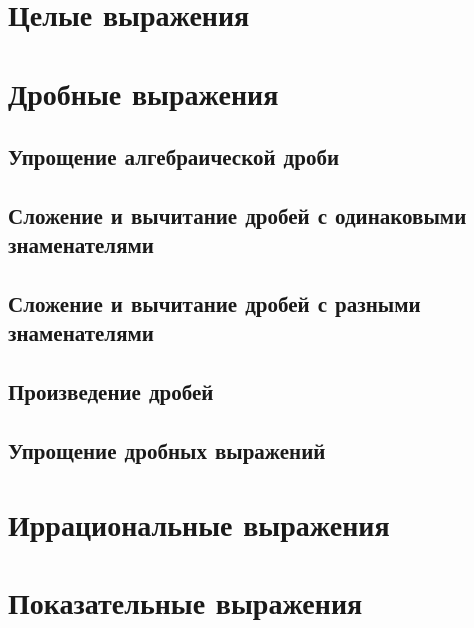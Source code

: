 \documentclass[10pt, a4paper]{article}
\begin{document}
\section{Целые выражения}
\section{Дробные выражения}
	\subsection{Упрощение алгебраической дроби}
	\subsection{Сложение и вычитание дробей с одинаковыми знаменателями}
	\subsection{Сложение и вычитание дробей с разными знаменателями}
	\subsection{Произведение дробей}
	\subsection{Упрощение дробных выражений}
		
\section{Иррациональные выражения}
\section{Показательные выражения}
\end{document}
